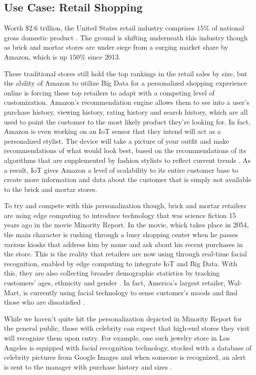 \documentclass[sigconf]{acmart}
\begin{document}
\subsection{Use Case: Retail Shopping}
Worth $\$2.6$ trillion, the United States retail industry comprises $15\%$ of national gross domestic product \cite{retail}. The ground is shifting underneath this industry though as brick and mortar stores are under siege from a surging market share by Amazon, which is up $150\%$ since 2013. 

These traditional stores still hold the top rankings in the retail sales by size, but the ability of Amazon to utilize Big Data for a personalized shopping experience online is forcing these top retailers to adapt with a competing level of customization. Amazon's recommendation engine allows them to see into a user's purchase history, viewing history, rating history and search history, which are all used to point the customer to the most likely product they're looking for. In fact, Amazon is even working on an IoT sensor that they intend will act as a personalized stylist. The device will take a picture of your outfit and make recommendations of what would look best, based on the recommendations of its algorithms that are supplemented by fashion stylists to reflect current trends \cite{amznstyle}. As a result, IoT gives Amazon a level of scalability to its entire customer base to create more information and data about the customer that is simply not available to the brick and mortar stores. 

To try and compete with this personalization though, brick and mortar retailers are using edge computing to introduce technology that was science fiction 15 years ago in the movie Minority Report. In the movie, which takes place in 2054, the main character is rushing through a busy shopping center when he passes various kiosks that address him by name and ask about his recent purchases in the store. This is the reality that retailers are now using through real-time facial recognition, enabled by edge computing to integrate IoT and Big Data. With this, they are also collecting broader demographic statistics by tracking customers' ages, ethnicity and gender \cite{facialtech}. In fact, America's largest retailer, Wal-Mart, is currently using facial technology to sense customer's moods and find those who are dissatisfied \cite{walmart}. 

While we haven't quite hit the personalization depicted in Minority Report for the general public, those with celebrity can expect that high-end stores they visit will recognize them upon entry. For example, one such jewelry store in Los Angeles is equipped with facial recognition technology, stocked with a database of celebrity pictures from Google Images and when someone is recognized, an alert is sent to the manager with purchase history and sizes \cite{npr}. 
\end{document}
